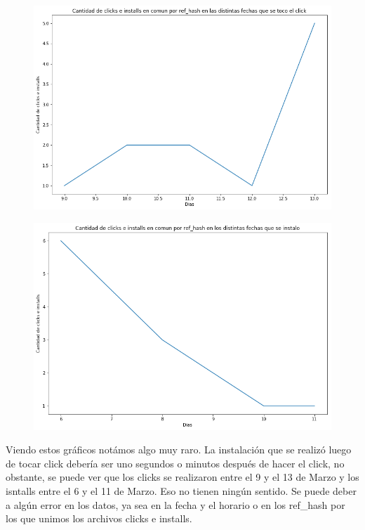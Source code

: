 \documentclass[a4paper, 12pt]{article}
\newcommand\tab[1][1cm]{\hspace*{#1}}
\begin{document}
{{	\FloatBarrier
		\begin{figure}[h]
			\centering
			\includegraphics[width=\textwidth]{images/clicks-installs/days_clicks.png}
			\caption{}
		\end{figure}
	\FloatBarrier
	
	\FloatBarrier
		\begin{figure}[h]
			\centering
			\includegraphics[width=\textwidth]{images/clicks-installs/days_installs.png}
			\caption{}
		\end{figure}
	\FloatBarrier

	\tab Viendo estos gráficos notámos algo muy raro. La instalación que se realizó luego de tocar click debería ser uno segundos o minutos después de hacer el click, no obstante, se puede ver que los clicks se realizaron entre el 9 y el 13 de Marzo y los isntalls entre el 6 y el 11 de Marzo. Eso no tienen ningún sentido. Se puede deber a algún error en los datos, ya sea en la fecha y el horario o en los ref\_hash por los que unimos los archivos clicks e installs.
	
}}
\end{document}
